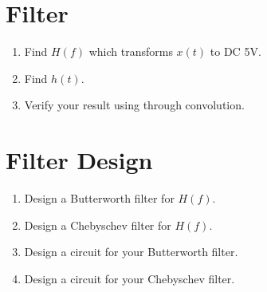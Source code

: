 \documentclass[journal,12pt,twocolumn]{IEEEtran}
\renewcommand\thesection{\arabic{section}}
\begin{document}
\section{Filter}
\begin{enumerate}[label=\thesection.\arabic*
,ref=\thesection.\theenumi]
\item Find $H(f)$ which transforms $x(t)$ to DC 5V.
\item Find $h(t)$.
\item Verify your result using  through convolution.
\end{enumerate}
\section{Filter Design}
\begin{enumerate}[label=\thesection.\arabic*
,ref=\thesection.\theenumi]
\item Design a Butterworth filter for $H(f)$.
\item Design a Chebyschev filter for $H(f)$.
\item Design a circuit for your Butterworth filter.
\item Design a circuit for your Chebyschev filter.
\end{enumerate}
\end{document}
